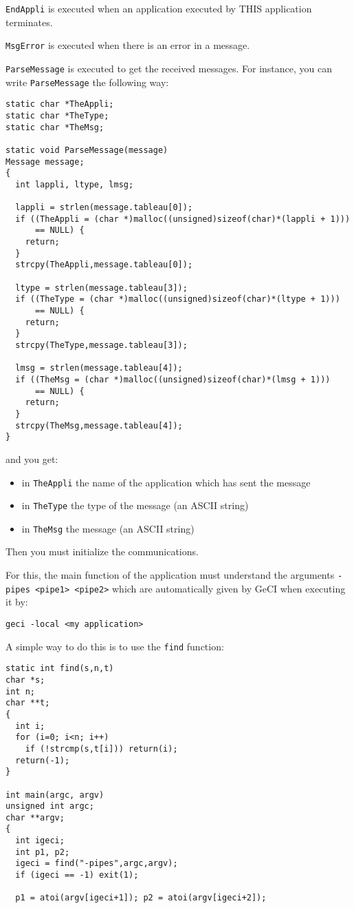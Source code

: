 \documentclass[11pt]{article}
\newcommand{\T}[1]{\texttt{#1}}
\begin{document}
\T{EndAppli} is executed when an application executed by THIS
application terminates.

\T{MsgError} is executed when there is an error in a message.

\T{ParseMessage} is executed to get the received messages.
For instance, you can write \T{ParseMessage} the following way:

\begin{verbatim}
static char *TheAppli;
static char *TheType;
static char *TheMsg;    

static void ParseMessage(message)
Message message;
{
  int lappli, ltype, lmsg;

  lappli = strlen(message.tableau[0]);
  if ((TheAppli = (char *)malloc((unsigned)sizeof(char)*(lappli + 1)))
      == NULL) {
    return;
  }
  strcpy(TheAppli,message.tableau[0]);

  ltype = strlen(message.tableau[3]);
  if ((TheType = (char *)malloc((unsigned)sizeof(char)*(ltype + 1)))
      == NULL) {
    return;
  }
  strcpy(TheType,message.tableau[3]);

  lmsg = strlen(message.tableau[4]);
  if ((TheMsg = (char *)malloc((unsigned)sizeof(char)*(lmsg + 1)))
      == NULL) {
    return;
  }
  strcpy(TheMsg,message.tableau[4]);
}
\end{verbatim}

and you get:

\begin{itemize}
\item in \T{TheAppli} the name of the application which has sent the message
\item in \T{TheType} the type of the message (an ASCII string)
\item in \T{TheMsg} the message (an ASCII string)
\end{itemize}

Then you must initialize the communications. 

For this, the main function of the 
application must understand the arguments \T{-pipes <pipe1> <pipe2>} which
are automatically given by GeCI when executing it by:

\begin{verbatim}
geci -local <my application>
\end{verbatim}

A simple way to do this is to use the \T{find} function:
\begin{verbatim}
static int find(s,n,t)
char *s;
int n;
char **t;
{
  int i;
  for (i=0; i<n; i++)
    if (!strcmp(s,t[i])) return(i);
  return(-1);
}

int main(argc, argv)
unsigned int argc;
char **argv;
{
  int igeci;
  int p1, p2;
  igeci = find("-pipes",argc,argv);
  if (igeci == -1) exit(1);

  p1 = atoi(argv[igeci+1]); p2 = atoi(argv[igeci+2]);
\end{verbatim}
\end{document}
